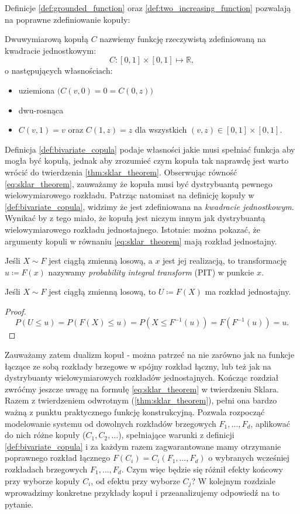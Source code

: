 Definicje \ref{def:grounded_function} oraz \ref{def:two_increasing_function} pozwalają na poprawne zdefiniowanie kopuły:
\begin{df}
	Dwuwymiarową kopułą $C$ nazwiemy funkcję rzeczywistą zdefiniowaną na kwadracie jednostkowym:
	$$ C\colon [0, 1]\times[0, 1] \mapsto \mathbb{R},$$ o następujących własnościach:
	\begin{itemize}
		\item uziemiona $\big(C(v, 0) = 0 = C(0, z)\big)$
		\item dwu-rosnąca
		\item $C(v, 1) = v$ oraz $C(1, z) = z$ dla wszystkich $(v, z)\in [0,1]\times [0, 1].$
	\end{itemize}
	\label{def:bivariate_copula}
\end{df}

Definicja \ref{def:bivariate_copula} podaje własności jakie musi spełniać funkcja aby mogła być kopułą, jednak aby zrozumieć czym kopuła tak naprawdę jest warto wrócić do twierdzenia \ref{thm:sklar_theorem}. Obserwując równość \ref{eq:sklar_theorem}, zauważamy że kopuła musi być dystrybuantą pewnego wielowymiarowego rozkładu. Patrząc natomiast na definicję kopuły w \ref{def:bivariate_copula}, widzimy że jest zdefiniowana na \emph{kwadracie jednostkowym}. Wynikać by z tego miało, że kopułą jest niczym innym jak dystrybuantą wielowymiarowego rozkładu jednostajnego. Istotnie: można pokazać, że argumenty kopuli w równaniu \ref{eq:sklar_theorem} mają rozkład jednostajny.

\begin{df}
	Jeśli $X\sim F$ jest ciągłą zmienną losową, a $x$ jest jej realizacją, to transformację $u\coloneqq F(x)$ nazywamy \emph{probability integral transform} (PIT) w punkcie $x$.
\end{df}
\begin{thm}
	Jeśli $X\sim F$ jest ciągłą zmienną losową, to $U\coloneqq F(X)$ ma rozkład jednostajny.
\end{thm}
\begin{proof}
	$$P(U\leqslant u) = P(F(X) \leqslant u) = P(X\leqslant F^{-1}(u))=F(F^{-1}(u))=u.$$
\end{proof}

Zauważamy zatem dualizm kopuł - można patrzeć na nie zarówno jak na funkcje łączące ze sobą rozkłady brzegowe w spójny rozkład łączny, lub też jak na dystrybuanty wielowymiarowych rozkładów jednostajnych. Kończąc rozdział zwróćmy jeszcze uwagę na formułę \ref{eq:sklar_theorem} w twierdzeniu Sklara. Razem z twierdzeniem odwrotnym (\ref{thm:sklar_theorem}), pełni ona bardzo ważną z punktu praktycznego funkcję konstrukcyjną. Pozwala rozpocząć modelowanie systemu od dowolnych rozkładów brzegowych $F_1, \dots, F_d$, aplikować do nich różne kopuły ($C_1, C_2, \dots$), spełniające warunki z definicji \ref{def:bivariate_copula} i za każdym razem zagwarantowane mamy otrzymanie poprawnego rozkład łącznego $F(C_i) = C_i(F_1, \dots, F_d)$ o wybranych wcześniej rozkładach brzegowych $F_1, \dots, F_d$. Czym więc będzie się różnił efekty końcowy przy wyborze kopuły $C_i$, od efektu przy wyborze $C_j$? W kolejnym rozdziale wprowadzimy konkretne przykłady kopuł i przeanalizujemy odpowiedź na to pytanie.
